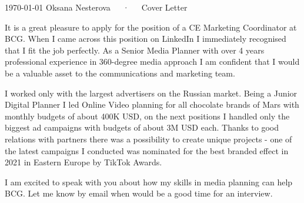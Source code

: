 \documentclass[11pt, a4paper]{awesome-cv}
\begin{document}
\makecvheader[R]

\makecvfooter
  {\today}
  {Oksana Nesterova~~~·~~~Cover Letter}
  {}

\makelettertitle

\begin{cvletter}

It is a great pleasure to apply for the position of a CE Marketing Coordinator at BCG. When I came across this position on LinkedIn I immediately recognised that I fit the job perfectly. As a Senior Media Planner with over 4 years professional experience in 360-degree media approach I am confident that I would be a valuable asset to the communications and marketing team.

I worked only with the largest advertisers on the Russian market. Being a Junior Digital Planner I led Online Video planning for all chocolate brands of Mars with monthly budgets of about 400K USD, on the next positions I handled only the biggest ad campaigns with budgets of about 3M USD each. Thanks to good relations with partners there was a possibility to create unique projects - one of the latest campaigns I conducted was nominated for the best branded effect in 2021 in Eastern Europe by TikTok Awards.

I am excited to speak with you about how my skills in media planning can help BCG. Let me know by email when would be a good time for an interview.

\end{cvletter}


\makeletterclosing
\end{document}
